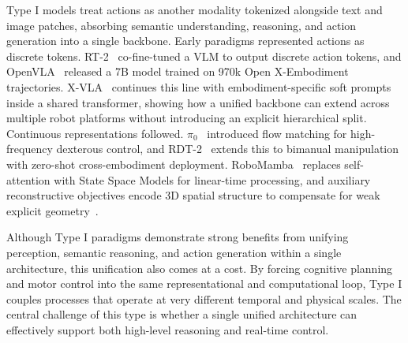 \documentclass[acmsmall,screen,review]{acmart}
\begin{document}
Type I models treat actions as another modality tokenized alongside text and image patches, absorbing semantic understanding, reasoning, and action generation into a single backbone. 
Early paradigms represented actions as discrete tokens. RT-2~\cite{brohan2023rt2} co-fine-tuned a VLM to output discrete action tokens, and OpenVLA~\cite{kim2024openvla} released a 7B model trained on 970k Open X-Embodiment trajectories. X-VLA~\cite{zheng2026xvla} continues this line with embodiment-specific soft prompts inside a shared transformer, showing how a unified backbone can extend across multiple robot platforms without introducing an explicit hierarchical split. Continuous representations followed. $\pi_0$~\cite{black2024pi0} introduced flow matching for high-frequency dexterous control, and RDT-2~\cite{liu2026rdt2} extends this to bimanual manipulation with zero-shot cross-embodiment deployment. RoboMamba~\cite{liu2024robomamba} replaces self-attention with State Space Models for linear-time processing, and auxiliary reconstructive objectives encode 3D spatial structure to compensate for weak explicit geometry~\cite{song2025reconvla}.

Although Type I paradigms demonstrate strong benefits from unifying perception, semantic reasoning, and action generation within a single architecture, this unification also comes at a cost.
By forcing cognitive planning and motor control into the same representational and computational loop, Type I couples processes that operate at very different temporal and physical scales. 
The central challenge of this type is whether a single unified architecture can effectively support both high-level reasoning and real-time control.
\end{document}
